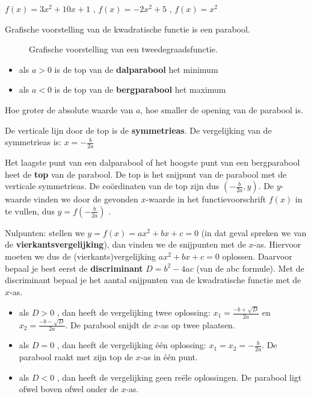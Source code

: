 \begin{voorbeeld}
	$f(x)=3x^{2}+10x+1$ , $f(x)=-2x^{2}+5$
, $f(x)=x^{2}$
\end{voorbeeld}

Grafische voorstelling van de kwadratische functie
is een parabool.

\begin{figure}[h]
\centering{}
\caption{Grafische voorstelling van een tweedegraadsfunctie.}
\label{fig:tweede} 
\end{figure}

\begin{itemize}
\item als $a>0$ is de top van de \textbf{dalparabool} het minimum
\item als $a<0$ is de top van de \textbf{bergparabool} het maximum
\end{itemize}
Hoe groter de absolute waarde van $a$, hoe smaller de opening
van de parabool is.

De verticale lijn door de top is de \textbf{symmetrieas}.
De vergelijking van de symmetrieas is: $x=-\frac{b}{2a}$ 

Het laagste punt van een dalparabool of het hoogste punt
van een bergparabool heet de \textbf{top} van de parabool. De top
is het snijpunt van de parabool met de verticale symmetrieas. De co\"ordinaten
van de top zijn dus $(-\frac{b}{2a},y)$. De $y$-waarde vinden we
door de gevonden $x$-waarde in het functievoorschrift $f(x)$ in
te vullen, dus $y=f(-\frac{b}{2a})$ .

Nulpunten: stellen we $y=f(x)=ax^{2}+bx+c=0$
(in dat geval spreken we van de \textbf{vierkantsvergelijking}), dan
vinden we de snijpunten met de $x$-as. Hiervoor moeten we dus de
(vierkants)vergelijking $ax^{2}+bx+c=0$ oplossen. Daarvoor bepaal
je best eerst de \textbf{discriminant} $D=b^{2}-4ac$ (van de abc
formule). Met de discriminant bepaal je het aantal snijpunten van
de kwadratische functie met de $x$-as.
\begin{itemize}
\item als $D>0$ , dan heeft de vergelijking twee oplossing: $x_{1}=\frac{-b+\sqrt{D}}{2a}$
en $x_{2}=\frac{-b-\sqrt{D}}{2a}$. De parabool snijdt de $x$-as
op twee plaatsen.
\item als $D=0$ , dan heeft de vergelijking \'e\'en oplossing: $x_{1}=x_{2}=-\frac{b}{2a}$.
De parabool raakt met zijn top de $x$-as in \'e\'en punt.
\item als $D<0$ , dan heeft de vergelijking geen re\"ele oplossingen. De
parabool ligt ofwel boven ofwel onder de $x$-as.
\end{itemize}

